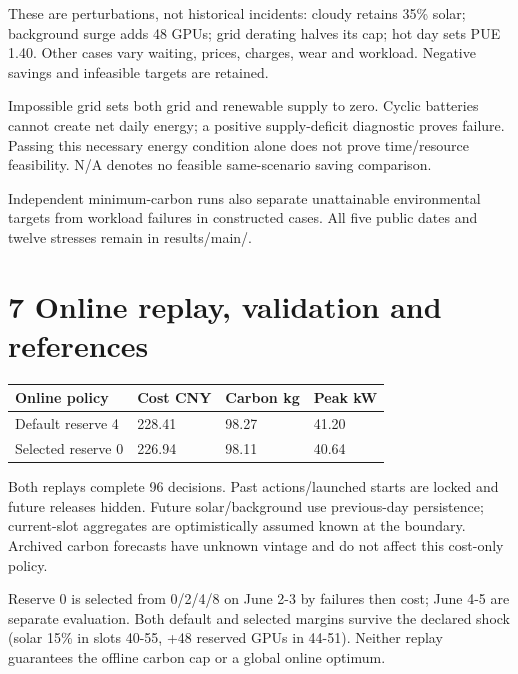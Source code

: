 \documentclass[10pt,a4paper]{article}
\begin{document}
These are perturbations, not historical incidents: cloudy retains 35\% solar; background surge adds 48 GPUs; grid derating halves its cap; hot day sets PUE 1.40. Other cases vary waiting, prices, charges, wear and workload. Negative savings and infeasible targets are retained.

Impossible grid sets both grid and renewable supply to zero. Cyclic batteries cannot create net daily energy; a positive supply-deficit diagnostic proves failure. Passing this necessary energy condition alone does not prove time/resource feasibility. N/A denotes no feasible same-scenario saving comparison.

{\small Independent minimum-carbon runs also separate unattainable environmental targets from workload failures in constructed cases. All five public dates and twelve stresses remain in results/main/.\par}

\clearpage
\section*{7  Online replay, validation and references}
\begin{center}\begingroup\setlength{\tabcolsep}{4pt}
\renewcommand{\arraystretch}{1.2}
\fontsize{8.3}{11.62}\selectfont
\begin{tabular}{@{}p{199.57pt}p{85.53pt}p{85.53pt}p{88.38pt}@{}}
\toprule
\textbf{Online policy} & \textbf{Cost CNY} & \textbf{Carbon kg} & \textbf{Peak kW} \\
\midrule
Default reserve 4 & 228.41 & 98.27 & 41.20 \\
Selected reserve 0 & 226.94 & 98.11 & 40.64 \\
\bottomrule\end{tabular}\endgroup\end{center}

Both replays complete 96 decisions. Past actions/launched starts are locked and future releases hidden. Future solar/background use previous-day persistence; current-slot aggregates are optimistically assumed known at the boundary. Archived carbon forecasts have unknown vintage and do not affect this cost-only policy.

Reserve 0 is selected from 0/2/4/8 on June 2-3 by failures then cost; June 4-5 are separate evaluation. Both default and selected margins survive the declared shock (solar 15\% in slots 40-55, +48 reserved GPUs in 44-51). Neither replay guarantees the offline carbon cap or a global online optimum.
\end{document}
